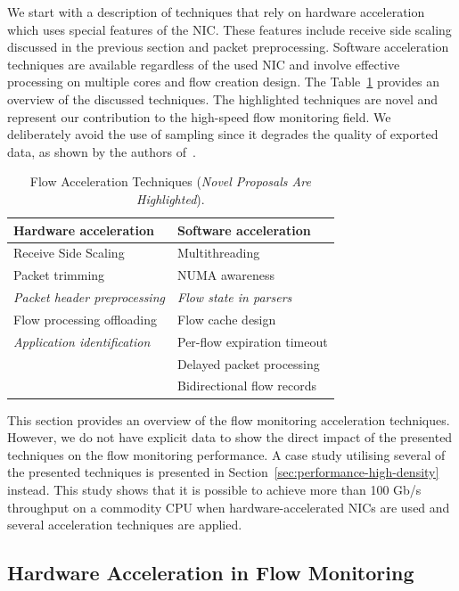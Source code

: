 We start with a description of techniques that rely on hardware acceleration which uses special features of the NIC. These features include receive side scaling discussed in the previous section and packet preprocessing. Software acceleration techniques are available regardless of the used NIC and involve effective processing on multiple cores and flow creation design. The Table~\ref{tab:flow-acc-techniques} provides an overview of the discussed techniques. The highlighted techniques are novel and represent our contribution to the high-speed flow monitoring field. We deliberately avoid the use of sampling since it degrades the quality of exported data, as shown by the authors of~\cite{Brauckhoff-2006-Impact}.

\begin{table}[ht!]
    \centering
    \begin{tabular}{l|l}
    \toprule
    \textbf{Hardware acceleration} & \textbf{Software acceleration} \\ \hline
    Receive Side Scaling & Multithreading \\
    Packet trimming & NUMA awareness \\
    \emph{Packet header preprocessing} & \emph{Flow state in parsers} \\
    Flow processing offloading & Flow cache design \\
    \emph{Application identification} & Per-flow expiration timeout \\ 
    & Delayed packet processing \\ 
    & Bidirectional flow records \\ \bottomrule
    \end{tabular}
    \caption{Flow Acceleration Techniques (\emph{Novel Proposals Are Highlighted}).}
    \label{tab:flow-acc-techniques}
\end{table}

This section provides an overview of the flow monitoring acceleration techniques. However, we do not have explicit data to show the direct impact of the presented techniques on the flow monitoring performance. A case study utilising several of the presented techniques is presented in Section~\ref{sec:performance-high-density} instead. This study shows that it is possible to achieve more than 100 Gb/s throughput on a commodity CPU when hardware-accelerated NICs are used and several acceleration techniques are applied.


\subsection{Hardware Acceleration in Flow Monitoring}\label{sec:performance-hw-acceleration}

